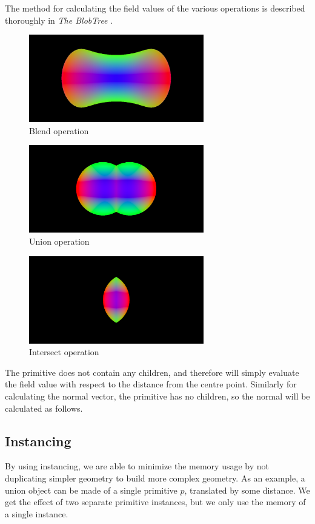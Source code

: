 \documentclass[conference]{acmsiggraph}
\begin{document}
The method for calculating the field values of the various operations is
described thoroughly in \textit{The BlobTree} \cite{Wyvill}.

\begin{figure}[htbp]
	\centering
	\includegraphics[height=1.5in]{images/blend.png}
	\caption{Blend operation}
\end{figure}

\begin{figure}[htbp]
	\centering
	\includegraphics[height=1.5in]{images/union.png}
	\caption{Union operation}
\end{figure}

\begin{figure}[htbp]
	\centering
	\includegraphics[height=1.5in]{images/intersect.png}
	\caption{Intersect operation}
\end{figure}

The primitive does not contain any children, and therefore will simply
evaluate the field value with respect to the distance from the centre point.
Similarly for calculating the normal vector, the primitive has no children, so
the normal will be calculated as follows.

\subsection{Instancing}
By using instancing, we are able to minimize the memory usage by not
duplicating simpler geometry to build more complex geometry. As an example, a
union object can be made of a single primitive $p$, translated by some
distance. We get the effect of two separate primitive instances, but we only
use the memory of a single instance.
\end{document}

